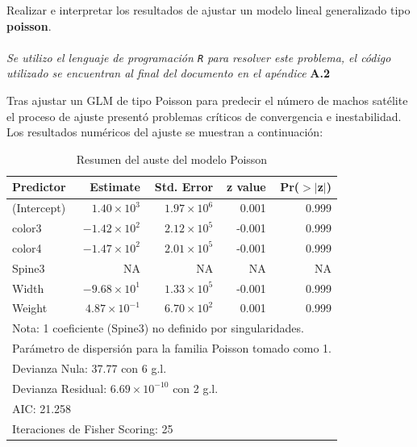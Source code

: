 Realizar e interpretar los resultados de ajustar un modelo lineal generalizado tipo \textbf{poisson}.\\

\noindent{}\\

\textit{Se utilizo el lenguaje de programación \texttt{R} para resolver este problema, el código utilizado se encuentran al final del documento en el apéndice} \textbf{A.2}

Tras ajustar un GLM de tipo Poisson para predecir el número de machos satélite el proceso de ajuste presentó problemas críticos de convergencia e inestabilidad. Los resultados numéricos del ajuste se muestran a continuación: 

\begin{table}[H]
\centering
\caption{Resumen del auste del modelo Poisson}
\label{tab:poisson_summary_invalid}
\begin{tabular}{lrrrr}
\hline
\textbf{Predictor} & \textbf{Estimate} & \textbf{Std. Error} & \textbf{z value} & \textbf{Pr($>$$|$z$|$)} \\
\hline
(Intercept) & $1.40 \times 10^{3}$  & $1.97 \times 10^{6}$  & 0.001 & 0.999 \\
color3      & $-1.42 \times 10^{2}$ & $2.12 \times 10^{5}$  & -0.001 & 0.999 \\
color4      & $-1.47 \times 10^{2}$ & $2.01 \times 10^{5}$  & -0.001 & 0.999 \\
Spine3      & NA                    & NA                    & NA    & NA    \\
Width       & $-9.68 \times 10^{1}$ & $1.33 \times 10^{5}$  & -0.001 & 0.999 \\
Weight      & $4.87 \times 10^{-1}$ & $6.70 \times 10^{2}$  & 0.001 & 0.999 \\
\hline
\multicolumn{5}{l}{\footnotesize Nota: 1 coeficiente (Spine3) no definido por singularidades.} \\
\multicolumn{5}{l}{\footnotesize Parámetro de dispersión para la familia Poisson tomado como 1.} \\
\multicolumn{5}{l}{\footnotesize Devianza Nula: 37.77 con 6 g.l.} \\
\multicolumn{5}{l}{\footnotesize Devianza Residual: $6.69 \times 10^{-10}$ con 2 g.l.} \\
\multicolumn{5}{l}{\footnotesize AIC: 21.258} \\
\multicolumn{5}{l}{\footnotesize Iteraciones de Fisher Scoring: 25} \\
\end{tabular}
\end{table}


